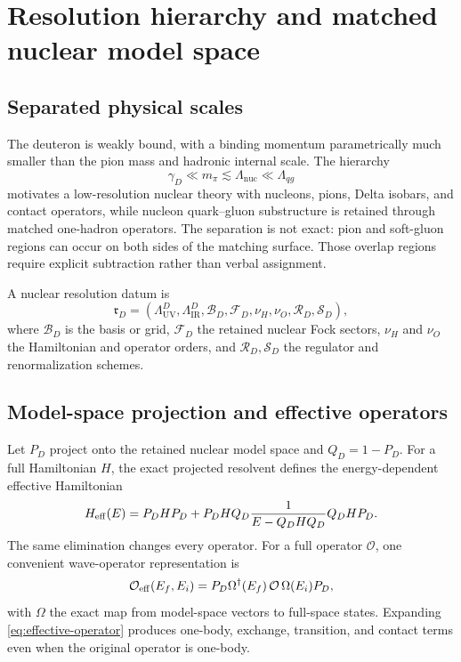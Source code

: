 \documentclass[11pt]{article}
\newcommand{\cO}{\mathcal O}
\newcommand{\cR}{\mathcal R}
\newcommand{\cS}{\mathcal S}
\newcommand{\nuc}{\mathrm{nuc}}
\newcommand{\UV}{\mathrm{UV}}
\newcommand{\IR}{\mathrm{IR}}
\begin{document}
\section{Resolution hierarchy and matched nuclear model space}
\label{sec:matching-hierarchy}

\subsection{Separated physical scales}

The deuteron is weakly bound, with a binding momentum parametrically much
smaller than the pion mass and hadronic internal scale.  The hierarchy
\begin{equation}
 \gamma_D\ll m_\pi\lesssim \Lambda_{\nuc}\ll \Lambda_{qg}
\label{eq:scale-hierarchy}
\end{equation}
motivates a low-resolution nuclear theory with nucleons, pions, Delta
isobars, and contact operators, while nucleon quark--gluon substructure is
retained through matched one-hadron operators.  The separation is not exact:
pion and soft-gluon regions can occur on both sides of the matching surface.
Those overlap regions require explicit subtraction rather than verbal
assignment.

A nuclear resolution datum is
\begin{equation}
 \mathfrak r_D=
 \left(
 \Lambda_{\UV}^{D},\Lambda_{\IR}^{D},
 \mathcal B_D,\mathcal F_D,
 \nu_H,\nu_O,
 \cR_D,\cS_D
 \right),
\label{eq:nuclear-resolution-datum}
\end{equation}
where \(\mathcal B_D\) is the basis or grid, \(\mathcal F_D\) the retained
nuclear Fock sectors, \(\nu_H\) and \(\nu_O\) the Hamiltonian and operator
orders, and \(\cR_D,\cS_D\) the regulator and renormalization schemes.

\subsection{Model-space projection and effective operators}

Let \(P_D\) project onto the retained nuclear model space and \(Q_D=1-P_D\).
For a full Hamiltonian \(H\), the exact projected resolvent defines the
energy-dependent effective Hamiltonian
\begin{equation}
 H_{\rm eff}(E)
 =P_DHP_D
 +P_DHQ_D\frac{1}{E-Q_DHQ_D}Q_DHP_D.
\label{eq:feshbach-hamiltonian}
\end{equation}
The same elimination changes every operator.  For a full operator \(\cO\),
one convenient wave-operator representation is
\begin{equation}
 \cO_{\rm eff}(E_f,E_i)
 =P_D\Omega^\dagger(E_f)\,\cO\,\Omega(E_i)P_D,
\label{eq:effective-operator}
\end{equation}
with \(\Omega\) the exact map from model-space vectors to full-space states.
Expanding \cref{eq:effective-operator} produces one-body, exchange,
transition, and contact terms even when the original operator is one-body.
\end{document}

